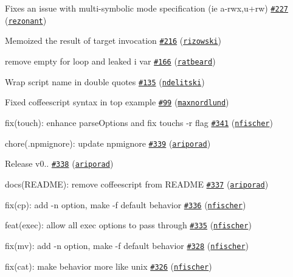 \begin{DoxyItemize}
\item Fixes an issue with multi-\/symbolic mode specification (ie a-\/rwx,u+rw) \href{https://github.com/shelljs/shelljs/pull/227}{\tt \#227} (\href{https://github.com/rezonant}{\tt rezonant})
\item Memoized the result of target invocation \href{https://github.com/shelljs/shelljs/pull/216}{\tt \#216} (\href{https://github.com/rizowski}{\tt rizowski})
\item remove empty for loop and leaked i var \href{https://github.com/shelljs/shelljs/pull/166}{\tt \#166} (\href{https://github.com/ratbeard}{\tt ratbeard})
\item Wrap script name in double quotes \href{https://github.com/shelljs/shelljs/pull/135}{\tt \#135} (\href{https://github.com/ndelitski}{\tt ndelitski})
\item Fixed coffeescript syntax in top example \href{https://github.com/shelljs/shelljs/pull/99}{\tt \#99} (\href{https://github.com/maxnordlund}{\tt maxnordlund})
\item fix(touch)\+: enhance parse\+Options and fix touch\textquotesingle{}s -\/r flag \href{https://github.com/shelljs/shelljs/pull/341}{\tt \#341} (\href{https://github.com/nfischer}{\tt nfischer})
\item chore(.npmignore)\+: update npmignore \href{https://github.com/shelljs/shelljs/pull/339}{\tt \#339} (\href{https://github.com/ariporad}{\tt ariporad})
\item Release v0.. \href{https://github.com/shelljs/shelljs/pull/338}{\tt \#338} (\href{https://github.com/ariporad}{\tt ariporad})
\item docs(\+R\+E\+A\+D\+M\+E)\+: remove coffeescript from R\+E\+A\+D\+ME \href{https://github.com/shelljs/shelljs/pull/337}{\tt \#337} (\href{https://github.com/ariporad}{\tt ariporad})
\item fix(cp)\+: add -\/n option, make -\/f default behavior \href{https://github.com/shelljs/shelljs/pull/336}{\tt \#336} (\href{https://github.com/nfischer}{\tt nfischer})
\item feat(exec)\+: allow all exec options to pass through \href{https://github.com/shelljs/shelljs/pull/335}{\tt \#335} (\href{https://github.com/nfischer}{\tt nfischer})
\item fix(mv)\+: add -\/n option, make -\/f default behavior \href{https://github.com/shelljs/shelljs/pull/328}{\tt \#328} (\href{https://github.com/nfischer}{\tt nfischer})
\item fix(cat)\+: make behavior more like unix \href{https://github.com/shelljs/shelljs/pull/326}{\tt \#326} (\href{https://github.com/nfischer}{\tt nfischer})

\end{DoxyItemize}
